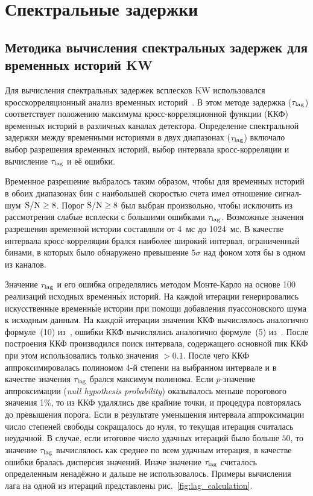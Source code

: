 \FloatBarrier

\section{Спектральные задержки}\label{sec:Lags}

\subsection{Методика вычисления спектральных задержек для временных историй KW}
Для вычисления спектральных задержек всплесков KW использовался 
кросскорреляционный анализ временных историй~\citep{Band_1997ApJ, Norris_2000}. 
В этом методе задержка ($\tau_{\mathrm{lag}}$) соответствует положению максимума 
кросс-корреляционной функции (ККФ) временных историй в различных каналах детектора.
Определение спектральной задержки между временными историями в двух диапазонах ($\tau_{\mathrm{lag}}$) 
включало выбор разрешения временных историй, выбор интервала кросс-корреляции 
и вычисление $\tau_{\mathrm{lag}}$ и её ошибки. 

Временное разрешение выбралось таким образом, чтобы для временных историй 
в обоих диапазонах бин с наибольшей скоростью счета имел отношение сигнал-шум~${\mathrm{S/N}} \geq 8$. 
Порог ${\mathrm{S/N}} \geq 8$ был выбран произвольно, чтобы исключить из рассмотрения 
слабые всплески с большими ошибками $\tau_{\mathrm{lag}}$. Возможные значения разрешения 
временной истории составляли от 4~мс до 1024~мс.
В качестве интервала кросс-корреляции брался наиболее широкий интервал, ограниченный
бинами, в которых было обнаружено превышение $5\sigma$ над фоном хотя бы в одном из каналов. 

Значение $\tau_{\mathrm{lag}}$ и его ошибка определялись методом Монте-Карло на основе 
100 реализаций исходных временн\'{ы}х историй. 
На каждой итерации генерировались искусственные временн\'{ы}е истории 
при помощи добавления пуассоновского шума к исходным данным.
На каждой итерации значения ККФ вычислялось аналогично формуле~(10) из~\citep{Band_1997ApJ}, 
ошибки ККФ вычислялись аналогично формуле~(5) из~\citep{Fenimore_1995}.
После построения ККФ производился поиск интервала, содержащего основной пик ККФ
при этом использовались только значения $>0.1$.  
После чего ККФ аппроксимировалась полиномом 4-й степени на выбранном интервале
и в качестве значения $\tau_{\mathrm{lag}}$ брался максимум полинома.
Если $p$-значение аппроксимации (\textit{null hypothesis probability}) 
оказывалось меньше порогового значения 1\%, 
то из ККФ удалялись две крайние точки, и процедура повторялась до превышения порога. 
Если в результате уменьшения интервала аппроксимации число степеней свободы сокращалось до нуля,
то текущая итерация считалась неудачной. 
В случае, если итоговое число удачных итераций было больше $50$, то значение $\tau_{\mathrm{lag}}$ 
вычислялось как среднее по всем удачным итерация, в качестве ошибки бралась дисперсия значений.
Иначе значение $\tau_{\mathrm{lag}}$ считалось определенным ненадёжно и дальше не использовалось.
Примеры вычисления лага на одной из итераций представлены рис.~\ref{fig:lag_calculation}.

